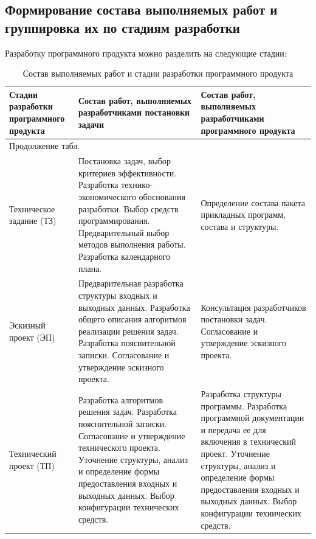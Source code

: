 \subsection{Формирование состава выполняемых работ и группировка их по стадиям разработки}
Разработку программного продукта можно разделить на следующие стадии:
\small{
\begin{longtable}{|p{}|p{}|p{}|}
  \caption{Состав выполняемых работ и стадии разработки программного продукта}
  \label{tab:containsAndStages}
  \\ \hline
  \multicolumn{1}{|p{0.16\textwidth}|}{\centering Стадии разработки программного продукта}
  & \multicolumn{1}{p{0.47\textwidth}|}{\centering Состав работ, выполняемых разработчиками постановки задачи}
  & \multicolumn{1}{p{0.3\textwidth}|}{\centering Состав работ, выполняемых разработчиками программного продукта} \\
  \hline
  \endfirsthead
  \multicolumn{2}{l}{Продолжение табл.~\thetable{}} \\[0.5ex]
  \hline
  \endhead

  \hline
  \endlastfoot

    Техническое задание (ТЗ) & Постановка задач, выбор критериев эффективности. Разработка технико-экономического обоснования разработки. Выбор средств программирования. Предварительный выбор методов выполнения работы. Разработка календарного плана. & Определение состава пакета прикладных программ, состава и структуры. \\

  \hline
    Эскизный проект (ЭП) & Предварительная разработка структуры входных и выходных данных. Разработка общего описания алгоритмов реализации решения задач. Разработка пояснительной записки. Согласование и утверждение эскизного проекта. & Консультация разработчиков постановки задач. Согласование и утверждение эскизного проекта. \\

  \hline
    Технический проект (ТП) & Разработка алгоритмов решения задач. Разработка пояснительной записки. Согласование и утверждение технического проекта. Уточнение структуры, анализ и определение формы предоставления входных и выходных данных. Выбор конфигурации технических средств. & Разработка структуры программы. Разработка программной документации и передача ее для включения в технический проект. Уточнение структуры, анализ и определение формы предоставления входных и выходных данных. Выбор конфигурации технических средств. \\


\end{longtable}}
